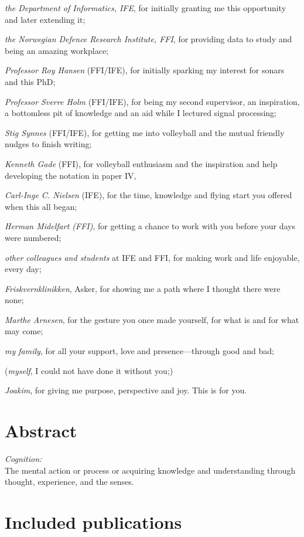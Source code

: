 \emph{the Department of Informatics, IFE}, for initially granting me this opportunity and later extending it;

\emph{the Norwegian Defence Research Institute, FFI}, for providing data to study and being an amazing workplace;

\emph{Professor Roy Hansen} (FFI/IFE), for initially sparking my interest for sonars and this PhD;

\emph{Professor Sverre Holm} (FFI/IFE), for being my second supervisor, an inspiration, a bottomless pit of knowledge and an aid while I lectured signal processing;

\emph{Stig Synnes} (FFI/IFE), for getting me into volleyball and the mutual friendly nudges to finish writing;

\emph{Kenneth Gade} (FFI), for volleyball enthusiasm and the inspiration and help developing the notation in paper IV,

\emph{Carl-Inge C. Nielsen} (IFE), for the time, knowledge and flying start you offered when this all began;

\emph{Herman Midelfart (FFI)}, for getting a chance to work with you before your days were numbered;

\emph{other colleagues and students} at IFE and FFI, for making work and life enjoyable, every day;

\emph{Friskvernklinikken}, Asker, for showing me a path where I thought there were none;

\emph{Marthe Arnesen}, for the gesture you once made yourself, for what is and for what may come;

\emph{my family}, for all your support, love and presence---through good and bad;

(\emph{myself}, I could not have done it without you;)

\emph{Joakim}, for giving me purpose, perspective and joy. This is for you. 



\newpage
\chapter*{Abstract}

\textit{Cognition:}\\The mental action or process or acquiring knowledge and understanding through thought, experience, and the senses.

\newpage
\chapter*{Included publications}

